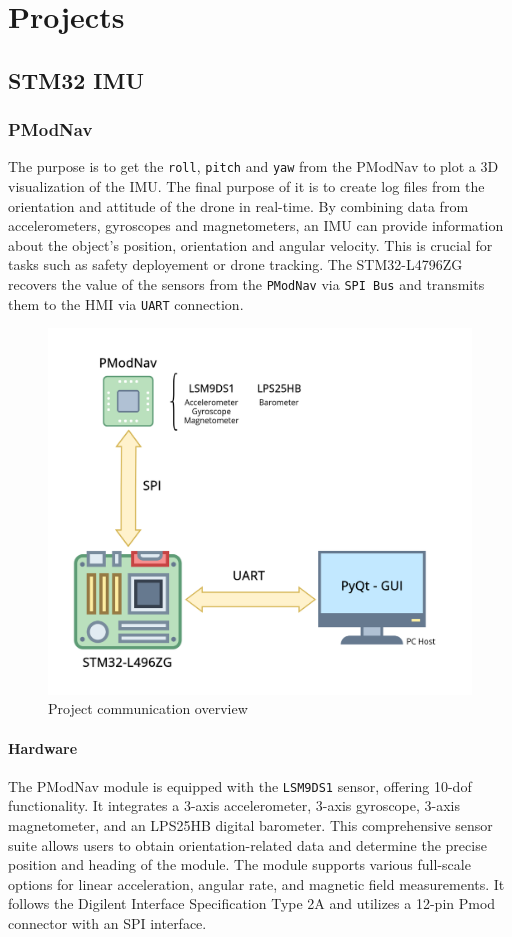 \chapter{Projects}

\section{STM32 IMU}
\subsection{PModNav}
The purpose is to get the \texttt{roll}, \texttt{pitch} and \texttt{yaw} from the PModNav to plot a 3D visualization of the IMU. The final purpose of it is to create log files from the orientation and attitude of the drone in real-time. By combining data from accelerometers, gyroscopes and magnetometers, an IMU can provide information about the object's position, orientation and angular velocity. This is crucial for tasks such as safety deployement or drone tracking.
The STM32-L4796ZG recovers the value of the sensors from the \texttt{PModNav} via \texttt{SPI Bus} and transmits them to the HMI via \texttt{UART} connection.
\begin{figure}[H]
    \centering
    \includegraphics[width=0.65\linewidth]{./projects/pmodnav/com.png}
    \caption{Project communication overview}
\end{figure}

\subsubsection{Hardware}
The PModNav module is equipped with the \texttt{LSM9DS1}\cite{LSM9DS1_digilent_lib} sensor, offering 10-\gls{dof} functionality. It integrates a 3-axis accelerometer, 3-axis gyroscope, 3-axis magnetometer, and an LPS25HB digital barometer. This comprehensive sensor suite allows users to obtain orientation-related data and determine the precise position and heading of the module. The module supports various full-scale options for linear acceleration, angular rate, and magnetic field measurements. It follows the Digilent Interface Specification Type 2A and utilizes a 12-pin Pmod connector with an SPI interface.

